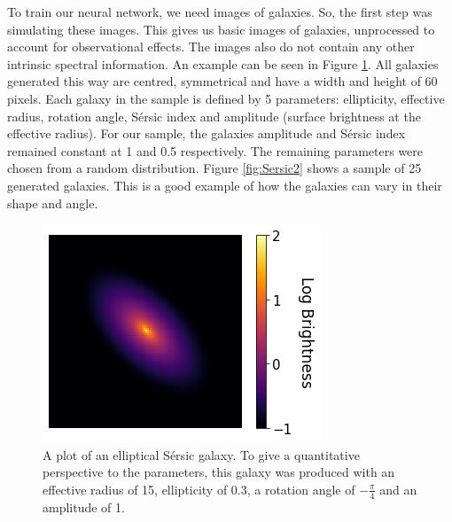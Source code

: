 \documentclass[fleqn,usenatbib]{mnras}
\begin{document}
To train our neural network, we need images of galaxies. So, the first step was simulating these images. This gives us basic images of galaxies, unprocessed to account for observational effects. The images also do not contain any other intrinsic spectral information. An example can be seen in Figure \ref{fig:Sersic}. All galaxies generated this way are centred, symmetrical and have a width and height of 60 pixels. Each galaxy in the sample is defined by 5 parameters: ellipticity, effective radius, rotation angle, S\'ersic index and amplitude (surface brightness at the effective radius). For our sample, the galaxies amplitude and S\'ersic index remained constant at 1 and 0.5 respectively. The remaining parameters were chosen from a random distribution. Figure \ref{fig:Sersic2} shows a sample of 25 generated galaxies. This is a good example of how the galaxies can vary in their shape and angle.

\begin{figure}
	\includegraphics[width=\columnwidth]{Sersic-v2.png}
    \caption{A plot of an elliptical S\'ersic galaxy. To give a quantitative perspective to the parameters, this galaxy was produced with an effective radius of 15, ellipticity of 0.3, a rotation angle of $- \frac{\pi}{4}$ and an amplitude of 1.}
    \label{fig:Sersic}
\end{figure}
\end{document}
